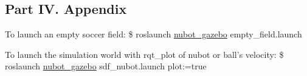 \subsection*{Part I\-V. Appendix}


\begin{DoxyEnumerate}
\item To launch an empty soccer field\-: {\ttfamily \$ roslaunch \hyperlink{namespacenubot__gazebo}{nubot\-\_\-gazebo} empty\-\_\-field.\-launch}
\item To launch the simulation world with rqt\-\_\-plot of nubot or ball's velocity\-: {\ttfamily \$ roslaunch \hyperlink{namespacenubot__gazebo}{nubot\-\_\-gazebo} sdf\-\_\-nubot.\-launch plot\-:=true} 
\end{DoxyEnumerate}